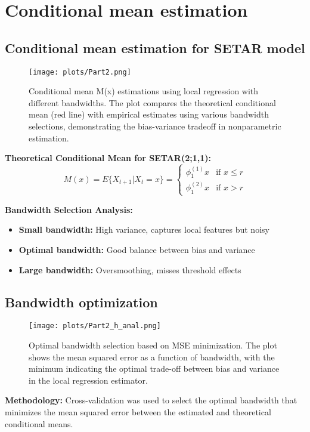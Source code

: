 \documentclass{article}
\begin{document}
\section{Conditional mean estimation}

\subsection{Conditional mean estimation for SETAR model}
\begin{figure}[H]
\centering
\texttt{[image: plots/Part2.png]}
\caption{Conditional mean M(x) estimations using local regression with different bandwidths. The plot compares the theoretical conditional mean (red line) with empirical estimates using various bandwidth selections, demonstrating the bias-variance tradeoff in nonparametric estimation.}
\label{fig:conditional_mean}
\end{figure}

\textbf{Theoretical Conditional Mean for SETAR(2;1,1):}
\[
M(x) = E\{X_{t+1}|X_t = x\} = 
\begin{cases}
\phi_1^{(1)} x & \text{if } x \leq r \\
\phi_1^{(2)} x & \text{if } x > r
\end{cases}
\]

\textbf{Bandwidth Selection Analysis:}
\begin{itemize}
\item \textbf{Small bandwidth:} High variance, captures local features but noisy
\item \textbf{Optimal bandwidth:} Good balance between bias and variance
\item \textbf{Large bandwidth:} Oversmoothing, misses threshold effects
\end{itemize}

\subsection{Bandwidth optimization}
\begin{figure}[H]
\centering
\texttt{[image: plots/Part2\_h\_anal.png]}
\caption{Optimal bandwidth selection based on MSE minimization. The plot shows the mean squared error as a function of bandwidth, with the minimum indicating the optimal trade-off between bias and variance in the local regression estimator.}
\label{fig:bandwidth_optimization}
\end{figure}

\textbf{Methodology:} Cross-validation was used to select the optimal bandwidth that minimizes the mean squared error between the estimated and theoretical conditional means.
\end{document}
